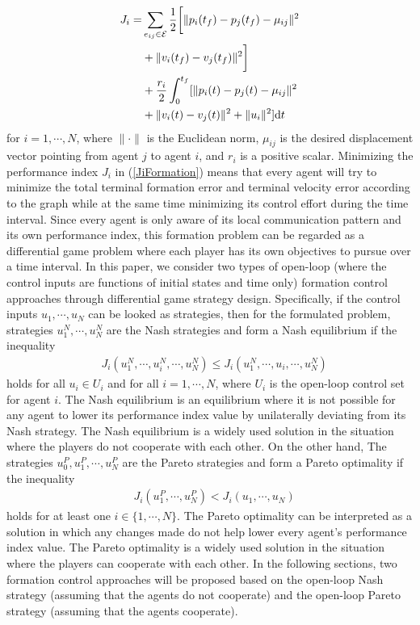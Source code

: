 \documentclass[letterpaper, 10 pt, conference,onecolumn]{ieeeconf}  %
\begin{document}
\begin{align}
J_i=&\sum_{e_{ij}\in\mathcal{E}} \frac{1}{2}\bigg[\|p_i(t_f)-p_j(t_f)-\mu_{ij}\|^2\notag\\
&+ \|v_i(t_f)-v_j(t_f)\|^2\bigg]\notag\\
&+\frac{r_i}{2}\int^{t_f}_0 [\|p_i(t)-p_j(t)-\mu_{ij}\|^2\notag\\
&+ \|v_i(t)-v_j(t)\|^2+ \|u_i\|^2]  \mbox{d}t\label{JiFormation}
\end{align}
for $i=1,\cdots,N$, where $\|\cdot\|$ is the Euclidean norm, $\mu_{ij}$ is the desired displacement vector pointing from {agent} $j$ to {agent} $i$, and $r_i$ is a positive scalar. {Minimizing the performance index $J_i$ in (\ref{JiFormation})} means that every agent will try to minimize the total terminal formation error and terminal velocity error according to the graph while at the same time minimizing its control effort during the time interval. Since every agent is only aware of its local communication pattern and its own performance index, this formation problem can be regarded as a differential game problem where each player {has} its own objectives to pursue over a time interval. In this paper, we consider two types of open-loop {(where the control inputs are functions of initial states and time only)} formation control approaches through {differential} game strategy design. Specifically, {if the control inputs $u_1,\cdots,u_N$ can be looked as strategies}, then for the formulated problem, strategies {$u^{N}_{1},\cdots,u^{N}_N$} are the Nash strategies and form a Nash equilibrium if the inequality
\begin{align}
&{J_{i}(u_1^{N},\cdots,u^{N}_i,\cdots,u^{N}_N)\leq J_{i}(u_1^{N},\cdots,u_i,\cdots,u^{N}_N)}\label{Nashinequality}
\end{align}
holds for all $u_i\in U_i$ and for all $i=1,\cdots,N$, where $U_i$ is the open-loop control set for agent $i$. The Nash equilibrium is an equilibrium where it is not possible for any agent to lower its performance index value by unilaterally deviating from its Nash strategy. The Nash equilibrium is a widely used solution in the situation where the players do not {cooperate} with each other. On the other hand, The strategies $u^{P}_0,u^{P}_{1},\cdots,u^{P}_N$ are the Pareto strategies and {form a Pareto optimality if the inequality
\begin{align}
&J_{i}(u^P_1,\cdots,u^P_N)< J_{i}(u_1,\cdots,u_N) \label{inequality}
\end{align}
holds for at least one $i\in\{1,\cdots,N\}$.} The Pareto optimality can be interpreted as a solution in which any changes made do not help lower every agent's performance index value. The Pareto optimality is a widely used solution in the situation where the players can {cooperate} with each other. In the following sections, two formation control approaches will be proposed based on the open-loop Nash strategy (assuming that the agents do not {cooperate}) and the open-loop Pareto strategy (assuming that the agents {cooperate}).
\end{document}
